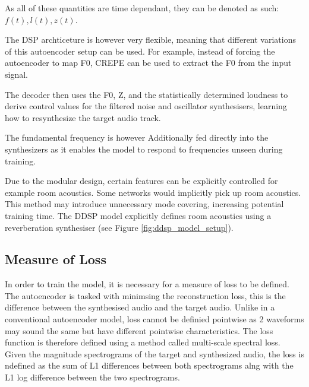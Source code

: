As all of these quantities are time dependant, they can be denoted as such: $f(t), l(t), z(t)$.

The DSP archticeture is however very flexible, meaning that different variations of this autoencoder setup can be used. For example, instead of forcing the autoencoder to map F0, CREPE can be used to extract the F0 from the input signal.

\vspace{0.5cm}
\vspace{0.5cm}

The decoder then uses the F0, Z, and the statistically determined loudness to derive control values for the filtered noise and oscillator synthesisers, learning how to resynthesize the target audio track.

The fundamental frequency is however Additionally fed directly into the synthesizers as it enables the model to respond to frequencies unseen during training\cite{SingingDDSP}.

Due to the modular design, certain features can be explicitly controlled for example room acoustics. Some networks would implicitly pick up room acoustics. This method may introduce unnecessary mode covering, increasing potential training time. The DDSP model explicitly defines room acoustics using a reverberation synthesiser (see Figure \ref{fig:ddsp_model_setup}).

\subsection{Measure of Loss}
\label{sec:loss_measure}

In order to train the model, it is necessary for a measure of loss to be defined. The autoencoder is tasked with minimsing the reconstruction loss, this is the difference between the synthesised audio and the target audio. Unlike in a conventional autoencoder model, loss cannot be definied pointwise as 2 waveforms may sound the same but have different pointwise characteristics. The loss function is therefore defined using a method called multi-scale spectral loss. Given the magnitude spectrograms of the target and synthesized audio, the loss is ndefined as the sum of L1 differences between both spectrograms alng with the L1 log difference between the two spectrograms.

